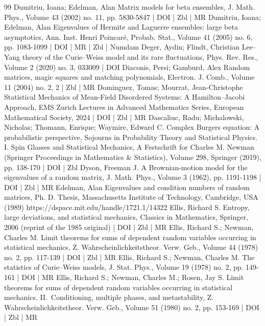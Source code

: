 \documentclass[10pt]{amsart}
\theoremstyle{definition}\newtheorem{defi}[theo]{Definition}\newtheorem{rema}[theo]{Remark}\newtheorem{exam}[theo]{Example}\newtheorem{exem}[theo]{Example}\newtheorem{nota}[theo]{Notation}
\begin{document}
\begin{thebibliography}{99}
Dumitriu, Ioana; Edelman, Alan Matrix models for beta ensembles, J. Math. Phys., Volume 43 (2002) no. 11, pp. 5830-5847 | DOI | Zbl | MR
Dumitriu, Ioana; Edelman, Alan Eigenvalues of Hermite and Laguerre ensembles: large beta asymptotics, Ann. Inst. Henri Poincaré, Probab. Stat., Volume 41 (2005) no. 6, pp. 1083-1099 | DOI | MR | Zbl | Numdam
Deger, Aydin; Flindt, Christian Lee–Yang theory of the Curie–Weiss model and its rare fluctuations, Phys. Rev. Res., Volume 2 (2020) no. 3, 033009 | DOI
Diaconis, Persi; Gamburd, Alex Random matrices, magic squares and matching polynomials, Electron. J. Comb., Volume 11 (2004) no. 2, 2 | Zbl | MR
Dominguez, Tomas; Mourrat, Jean-Christophe Statistical Mechanics of Mean-Field Disordered Systems: A Hamilton–Jacobi Approach, EMS Zurich Lectures in Advanced Mathematics Series, European Mathematical Society, 2024 | DOI | Zbl | MR
Dascaliuc, Radu; Michalowski, Nicholas; Thomann, Enrique; Waymire, Edward C. Complex Burgers equation: A probabilistic perspective, Sojourns in Probability Theory and Statistical Physics. I. Spin Glasses and Statistical Mechanics, A Festschrift for Charles M. Newman (Springer Proceedings in Mathematics \& Statistics), Volume 298, Springer (2019), pp. 138-170 | DOI | Zbl
Dyson, Freeman J. A Brownian-motion model for the eigenvalues of a random matrix, J. Math. Phys., Volume 3 (1962), pp. 1191-1198 | DOI | Zbl | MR
Edelman, Alan Eigenvalues and condition numbers of random matrices, Ph. D. Thesis, Massachusetts Institute of Technology, Cambridge, USA (1989) https://dspace.mit.edu/handle/1721.1/14322
Ellis, Richard S. Entropy, large deviations, and statistical mechanics, Classics in Mathematics, Springer, 2006 (reprint of the 1985 original) | DOI | Zbl | MR
Ellis, Richard S.; Newman, Charles M. Limit theorems for sums of dependent random variables occurring in statistical mechanics, Z. Wahrscheinlichkeitstheor. Verw. Geb., Volume 44 (1978) no. 2, pp. 117-139 | DOI | Zbl | MR
Ellis, Richard S.; Newman, Charles M. The statistics of Curie–Weiss models, J. Stat. Phys., Volume 19 (1978) no. 2, pp. 149-161 | DOI | MR
Ellis, Richard S.; Newman, Charles M.; Rosen, Jay S. Limit theorems for sums of dependent random variables occurring in statistical mechanics. II. Conditioning, multiple phases, and metastability, Z. Wahrscheinlichkeitstheor. Verw. Geb., Volume 51 (1980) no. 2, pp. 153-169 | DOI | Zbl | MR

\end{thebibliography}
\end{document}
